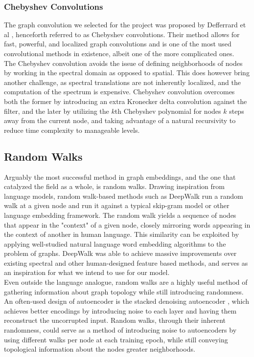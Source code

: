 \documentclass[12pt,twoside]{report}
\begin{document}
\subsubsection{Chebyshev Convolutions}

The graph convolution we selected for the project was proposed by Defferrard et al \cite{defferrard2016convolutional}, henceforth referred to as Chebyshev convolutions. Their method allows for fast, powerful, and localized graph convolutions and is one of the most used convolutional methods in existence, albeit one of the more complicated ones. \\

The Chebyshev convolution avoids the issue of defining neighborhoods of nodes by working in the spectral domain as opposed to spatial. This does however bring another challenge, as spectral translations are not inherently localized, and the computation of the spectrum is expensive. Chebyshev convolution overcomes both the former by introducing an extra Kronecker delta convolution against the filter, and the later by utilizing the $k$th Chebyshev polynomial for nodes $k$ steps away from the current node, and taking advantage of a natural recursivity to reduce time complexity to manageable levels. \\

\subsection{Random Walks}

Arguably the most successful method in graph embeddings, and the one that catalyzed the field as a whole, is random walks. Drawing inspiration from language models, random walk-based methods such as DeepWalk \cite{perozzi2014deepwalk} run a random walk at a given node and run it against a typical skip-gram model or other language embedding framework. The random walk yields a sequence of nodes that appear in the "context" of a given node, closely mirroring words appearing in the context of another in human language. This similarity can be exploited by applying well-studied natural language word embedding algorithms to the problem of graphs. DeepWalk was able to achieve massive improvements over existing spectral and other human-designed feature based methods, and serves as an inspiration for what we intend to use for our  model. \\

Even outside the language analogue, random walks are a highly useful method of gathering information about graph topology while still introducing randomness. An often-used design of autoencoder is the stacked denoising autoencoder \cite{vincent2010stacked}, which achieves better encodings by introducing noise to each layer and having them reconstruct the uncorrupted input. Random walks, through their inherent randomness, could serve as a method of introducing noise to autoencoders by using different walks per node at each training epoch, while still conveying topological information about the nodes greater neighborhoods. \\
\end{document}
